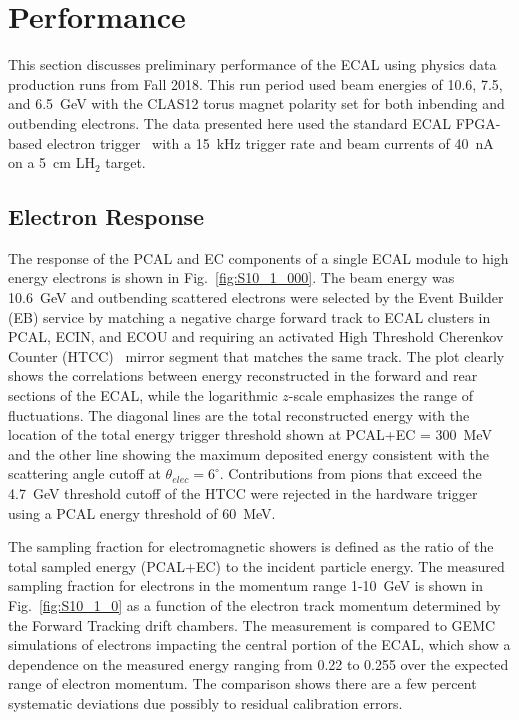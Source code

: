 \section{Performance}
\label{Performance}

This section discusses preliminary performance of the ECAL using physics data production runs from Fall 2018.
This run period used beam energies of 10.6, 7.5, and 6.5~GeV with the CLAS12 torus magnet polarity set for both
inbending and outbending electrons. The data presented here used the standard ECAL FPGA-based electron
trigger~\cite{nim:trig} with a 15~kHz trigger rate and beam currents of 40~nA on a 5~cm LH$_2$ target.

\subsection{Electron Response}

The response of the PCAL and EC components of a single ECAL module to high energy electrons is shown in
Fig.~\ref{fig:S10_1_000}. The beam energy was 10.6~GeV and outbending scattered electrons were selected by
the Event Builder (EB) service by matching a negative charge forward track to ECAL clusters in PCAL, ECIN, and
ECOU and requiring an activated High Threshold Cherenkov Counter (HTCC)~\cite{nim:htcc} mirror segment that
matches the same track. The plot clearly shows the correlations between energy reconstructed in the forward
and rear sections of the ECAL, while the logarithmic $z$-scale emphasizes the range of fluctuations. The diagonal
lines are the total reconstructed  energy with the location of the total energy trigger threshold shown at PCAL+EC =
300~MeV and the other line showing the maximum deposited energy consistent with the scattering angle cutoff at
$\theta_{elec}=6^\circ$. Contributions from pions that exceed the 4.7~GeV threshold cutoff of the HTCC were
rejected in the hardware trigger using a PCAL energy threshold of 60~MeV.

The sampling fraction for electromagnetic showers is defined as the ratio of the total sampled energy
(PCAL+EC) to the incident particle energy. The measured sampling fraction for electrons in the momentum range 1-10~GeV is shown in
Fig.~\ref{fig:S10_1_0} as a function of the electron track momentum determined by the Forward Tracking 
drift chambers.  The measurement is compared to GEMC simulations of electrons impacting the central portion of the ECAL,
which show a dependence on the measured energy ranging from 0.22 to 0.255 over the expected range of electron
momentum. The comparison shows there are a few percent systematic deviations due possibly to residual calibration errors.

